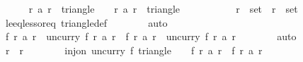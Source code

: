 \begin{isabellebody}
\ \ \ \ \isamarkupfalse%
\ {\isachardoublequoteopen}{\isacharparenleft}r{}{\isacharcomma}\ a\ r{}{\isacharparenright}\ {\isasymin}\ triangle\ {}\ {}\ {}{}{}{}{\isachardoublequoteclose}\ {\isachardoublequoteopen}{\isacharparenleft}r{}{\isacharcomma}\ a\ r{}{\isacharparenright}\ {\isasymin}\ triangle\ {}\ {}\ {}{}{}{}{\isachardoublequoteclose}\isanewline
\ \ \ \ \ \ \isamarkupfalse%
\ {\isacharbackquoteopen}r{}\ {\isasymin}\ set\ {\isacharbrackleft}{}{\isachardot}{\isachardot}{\isacharless}{}{}{}{}{\isacharbrackright}{\isacharbackquoteclose}\ {\isacharbackquoteopen}r{}\ {\isasymin}\ set\ {\isacharbrackleft}{}{\isachardot}{\isachardot}{\isacharless}{}{}{}{}{\isacharbrackright}{\isacharbackquoteclose}\ {\isacharasterisk}{\isacharparenleft}{}{\isacharparenright}\ {\isacharasterisk}{\isacharparenleft}{}{\isacharparenright}\isanewline
\ \ \ \ \ \ \isamarkupfalse%
\ le{\isacharunderscore}eq{\isacharunderscore}less{\isacharunderscore}or{\isacharunderscore}eq\ triangle{\isacharunderscore}def\isanewline
\ \ \ \ \ \ \isamarkupfalse%
\ auto\isanewline
\ \ \ \ \isamarkupfalse%
\isanewline
\ \ \ \ \isamarkupfalse%
\ {\isachardoublequoteopen}f\ r{}\ {\isacharparenleft}a\ r{}{\isacharparenright}\ {\isacharequal}\ {\isacharparenleft}uncurry\ f{\isacharparenright}\ {\isacharparenleft}r{}{\isacharcomma}\ a\ r{}{\isacharparenright}{\isachardoublequoteclose}\ \ {\isachardoublequoteopen}f\ r{}\ {\isacharparenleft}a\ r{}{\isacharparenright}\ {\isacharequal}\ {\isacharparenleft}uncurry\ f{\isacharparenright}\ {\isacharparenleft}r{}{\isacharcomma}\ a\ r{}{\isacharparenright}{\isachardoublequoteclose}\isanewline
\ \ \ \ \ \ \isamarkupfalse%
\ auto\isanewline
\ \ \ \ \isamarkupfalse%
\isanewline
\ \ \ \ \isamarkupfalse%
\ {\isachardoublequoteopen}r{}\ {\isacharequal}\ r{}{\isachardoublequoteclose}\isanewline
\ \ \ \ \ \ \isamarkupfalse%
\ {\isacharbackquoteopen}inj{\isacharunderscore}on\ {\isacharparenleft}uncurry\ f{\isacharparenright}\ {\isacharparenleft}triangle\ {}\ {}\ {}{}{}{}{\isacharparenright}{\isacharbackquoteclose}\ {\isacharbackquoteopen}f\ r{}\ {\isacharparenleft}a\ r{}{\isacharparenright}\ {\isacharequal}\ f\ r{}\ {\isacharparenleft}a\ r{}{\isacharparenright}{\isacharbackquoteclose}\isanewline

\end{isabellebody}
